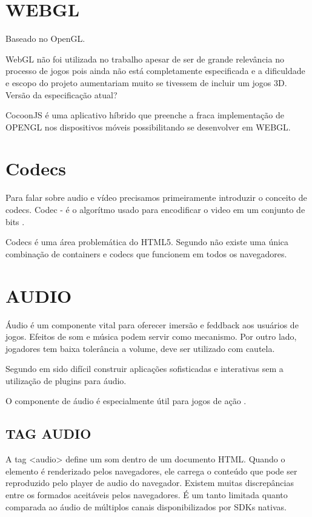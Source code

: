 \documentclass[
12pt,
a4paper,
portuges,
draft
]{report}
\begin{document}
\section{WEBGL}
Baseado no OpenGL.

WebGL não foi utilizada no trabalho apesar de ser de grande
relevância no processo de jogos pois ainda não está completamente
especificada e a dificuldade e escopo do projeto aumentariam muito se
tivessem de incluir um jogos 3D. Versão da especificação atual?

CocoonJS é uma aplicativo híbrido que preenche a fraca implementação
de OPENGL nos dispositivos móveis possibilitando se desenvolver em
WEBGL.


\section{Codecs}
Para falar sobre audio e vídeo precisamos primeiramente introduzir o conceito de codecs. Codec - é o algorítmo usado para encodificar o video em um conjunto de bits \cite{diveIntohtml}.

Codecs é uma área problemática do HTML5. Segundo \cite{diveIntohtml} não existe uma única combinação de containers e codecs que funcionem em todos os navegadores.


\section{AUDIO}
Áudio é um componente vital para oferecer imersão e feddback aos
usuários de jogos. Efeitos de som e música podem servir como mecanismo. 
Por outro lado, jogadores tem baixa tolerância a volume, deve ser utilizado com cautela.

Segundo \cite{browserGamesTechnologyAndFuture} em sido difícil construir aplicações sofisticadas e interativas sem a utilização de plugins para áudio.

O componente de áudio é especialmente útil para jogos de ação \autocite{browserGamesTechnologyAndFuture}.

\subsection{TAG AUDIO}

A tag <audio> define um som dentro de um documento HTML. Quando o
elemento é renderizado pelos navegadores, ele carrega o conteúdo
que pode ser reproduzido pelo player de audio do navegador. Existem
muitas discrepâncias entre os formados aceitáveis pelos navegadores.
É um tanto limitada quanto comparada ao áudio de múltiplos canais
disponibilizados por SDKs nativas.
\end{document}
